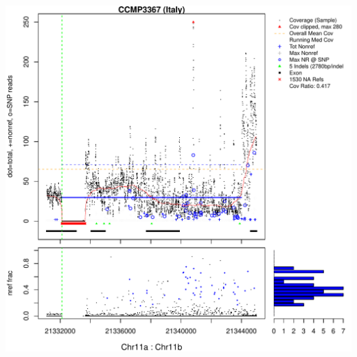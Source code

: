 \documentclass{article}\usepackage[]{graphicx}\usepackage[]{color}
\makeatletter
\def\maxwidth{ %
  \ifdim\Gin@nat@width>\linewidth
    \linewidth
  \else
    \Gin@nat@width
  \fi
}
\newenvironment{knitrout}{}{} %
\makeatother
\begin{document}
\begin{knitrout}
{\includegraphics[width=\maxwidth]{figs-knitr/unnamed-chunk-52-7} 

}



\end{knitrout}
\end{document}
